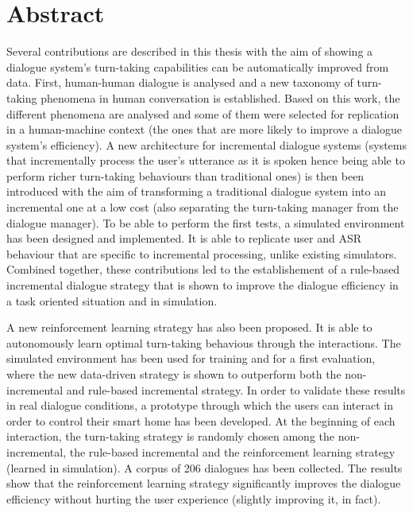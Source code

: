 \chapter*{Abstract}

     Several contributions are described in this thesis with the aim of showing a dialogue system's turn-taking capabilities can be automatically improved from data. First, human-human dialogue is analysed and a new taxonomy of turn-taking phenomena in human conversation is established. Based on this work, the different phenomena are analysed and some of them were selected for replication in a human-machine context (the ones that are more likely to improve a dialogue system's efficiency). A new architecture for incremental dialogue systems (systems that incrementally process the user's utterance as it is spoken hence being able to perform richer turn-taking behaviours than traditional ones) is then been introduced with the aim of transforming a traditional dialogue system into an incremental one at a low cost (also separating the turn-taking manager from the dialogue manager). To be able to perform the first tests, a simulated environment has been designed and implemented. It is able to replicate user and ASR behaviour that are specific to incremental processing, unlike existing simulators. Combined together, these contributions led to the establishement of a rule-based incremental dialogue strategy that is shown to improve the dialogue efficiency in a task oriented situation and in simulation.

     A new reinforcement learning strategy has also been proposed. It is able to autonomously learn optimal turn-taking behavious through the interactions. The simulated environment has been used for training and for a first evaluation, where the new data-driven strategy is shown to outperform both the non-incremental and rule-based incremental strategy. In order to validate these results in real dialogue conditions, a prototype through which the users can interact in order to control their smart home has been developed. At the beginning of each interaction, the turn-taking strategy is randomly chosen among the non-incremental, the rule-based incremental and the reinforcement learning strategy (learned in simulation). A corpus of 206 dialogues has been collected. The results show that the reinforcement learning strategy significantly improves the dialogue efficiency without hurting the user experience (slightly improving it, in fact).
